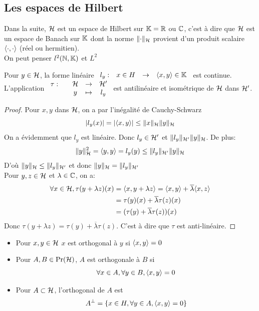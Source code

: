 \documentclass[]{report}
\begin{document}
    \subsection*{Les espaces de Hilbert}

    Dans la suite, $\mathcal{H}$ est un espace de Hilbert sur $\mathbb{K}=\mathbb{R}$ ou $\mathbb{C}$, c'est à dire que $\mathcal{H}$ est un espace de Banach sur $\mathbb{K}$ dont la norme $\lVert \cdot \rVert_{\mathcal{H}}$ provient d'un produit scalaire $\langle \cdot,\cdot \rangle$ (réel ou hermitien).\\
    On peut penser $l^2(\mathbb{N},\mathbb{K})$ et $L^2$

    \begin{prop}{}{}
        Pour $y\in \mathcal{H}$, la forme linéaire $\begin{array}{ccccc} l_y : & x\in H & \to & \langle x,y \rangle\in \mathbb{K} \end{array}$ est continue.\\
        L'application $\begin{array}{ccccc} \tau : & & \mathcal{H} & \to & \mathcal{H}' \\ & & y & \mapsto & l_y \end{array}$ est antilinéaire et isométrique de $\mathcal{H}$ dans $\mathcal{H}'$.
    \end{prop}

    \begin{proof}
        Pour $x,y$ dans $\mathcal{H}$, on a par l'inégalité de Cauchy-Schwarz
        \[|l_y(x)|=|\langle x,y \rangle|\le \lVert x \rVert_{\mathcal{H}}\lVert y \rVert_{\mathcal{H}}\]
        On a évidemment que $l_y$ est linéaire. Donc $l_y\in \mathcal{H}'$ et $\lVert l_y \rVert_{\mathcal{H}'}\lVert y \rVert_{\mathcal{H}}$. De plus:
        \[\lVert y \rVert_{\mathcal{H}}^2=\langle y,y \rangle=l_y(y)\le \lVert l_y \rVert_{\mathcal{H}'}\lVert y \rVert_{\mathcal{H}}\]
        D'où $\lVert y \rVert_{\mathcal{H}}\le \lVert l_y \rVert_{\mathcal{H}'}$ et donc $\lVert y \rVert_{\mathcal{H}}=\lVert l_y \rVert_{\mathcal{H}'}$\\
        Pour $y,z\in \mathcal{H}$ et $\lambda\in \mathbb{C}$, on a:
        \begin{align*}
            \forall x\in \mathcal{H}, \tau(y+\lambda z)(x)&=\langle x,y+\lambda z \rangle=\langle x,y \rangle+ \overline{\lambda}\langle x,z \rangle\\
            &=\tau(y)(x)+\overline{\lambda}\tau(z)(x)\\
            &=(\tau(y)+\overline{\lambda}\tau(z))(x)
        \end{align*}
        Donc $\tau(y+\lambda z)=\tau(y)+\overline{\lambda}\tau (z)$. C'est à dire que $\tau$ est anti-linéaire.
    \end{proof}

    \begin{df}{}{}
        \begin{itemize}
            \item Pour $x,y\in \mathcal{H}$ $x$ est orthogonal à $y$ si $\langle x,y \rangle=0$
            \item Pour $A,B\in \Pr(\mathcal{H})$, $A$ est orthogonale à $B$ si
            \[\forall x\in A,\forall y\in B, \langle x,y \rangle=0\]
            \item Pour $A\subset \mathcal{H}$, l'orthogonal de $A$ est
            \[A^{\perp}=\{x\in H,\forall y\in A, \langle x,y \rangle=0\}\]
        \end{itemize}
    \end{df}
\end{document}
